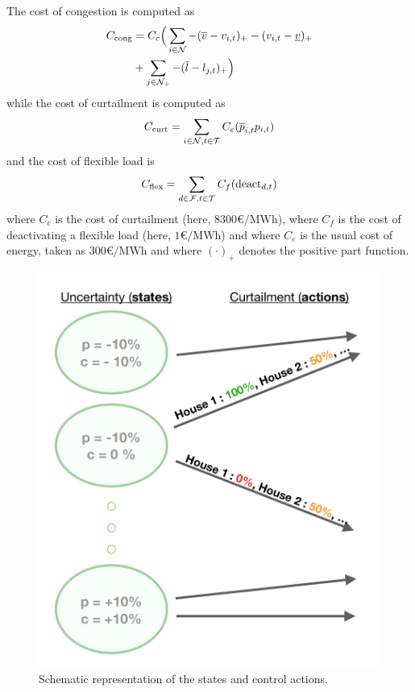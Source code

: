 The cost of congestion is computed as
\begin{align*}
  C_{\text{cong}} &= C_c \Big( \sum_{i \in \mathcal{N}} -(\overline{v}-v_{i,t})_+ - (v_{i,t}-\underline{v})_+  \\
  &+ \sum_{j \in \mathcal{N}_+} -(\overline{l}-l_{j,t})_+ \Big)
\end{align*}
while the cost of curtailment is computed as
\[
  C_{\text{curt}} = \sum_{i \in \mathcal{N},t \in \mathcal{T}} C_e(\overline{p}_{i,t}p_{i,t})
\]
and the cost of flexible load is
\[
  C_{\text{flex}} = \sum_{d \in \mathcal{F},t \in \mathcal{T}} C_f(\text{deact}_{d,t})
\]
where $C_c$ is the cost of curtailment (here, $8300\si{\euro\per\mega\watt\hour}$), where $C_f$ is the cost of deactivating a flexible load (here, $1\si{\euro\per\mega\watt\hour}$) and where $C_e$ is the usual cost of energy, taken as $300\si{\euro\per\mega\watt\hour}$ and where $(\cdot)_+$ denotes the positive part function.

\begin{figure}
  \begin{center}
    \includegraphics[scale=0.43]{./img/model_diagram.png}
  \end{center}
  \caption{Schematic representation of the states and control actions.}
  \label{fig:model_diag}
\end{figure}
